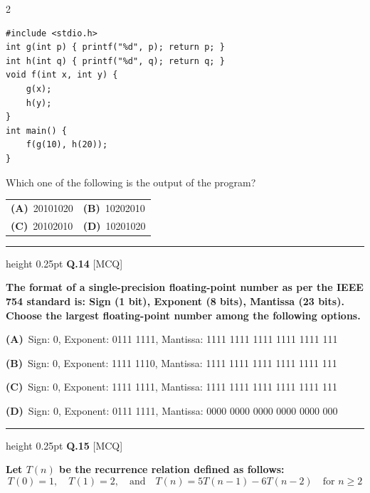 \documentclass[a4paper,10pt,twoside]{article}
\begin{document}
\begin{multicols}{2}
{\begin{verbatim}
#include <stdio.h>
int g(int p) { printf("%d", p); return p; }
int h(int q) { printf("%d", q); return q; }
void f(int x, int y) {
    g(x);
    h(y);
}
int main() {
    f(g(10), h(20));
}
\end{verbatim}
Which one of the following is the output of the program? \par}
\par\vspace{2pt}\noindent
\begin{tabular*}{\columnwidth}{@{\extracolsep{\fill}}p{}p{}@{}}
\textbf{(A)}~20101020 & \textbf{(B)}~10202010 \\
\addlinespace[2pt]
\textbf{(C)}~20102010 & \textbf{(D)}~10201020
\end{tabular*}
\par\vspace{6pt}\hrule height 0.25pt\vspace{6pt}
\noindent\textbf{Q.14} \hfill {\footnotesize\textsf{[MCQ]}}
\par\vspace{2pt}
{\bfseries The format of a single-precision floating-point number as per the IEEE 754 standard is:
Sign (1 bit), Exponent (8 bits), Mantissa (23 bits).
Choose the largest floating-point number among the following options. \par}
\par\vspace{2pt}\noindent
\textbf{(A)}~Sign: 0, Exponent: 0111 1111, Mantissa: 1111 1111 1111 1111 1111 111\par\vspace{2pt}\noindent
\textbf{(B)}~Sign: 0, Exponent: 1111 1110, Mantissa: 1111 1111 1111 1111 1111 111\par\vspace{2pt}\noindent
\textbf{(C)}~Sign: 0, Exponent: 1111 1111, Mantissa: 1111 1111 1111 1111 1111 111\par\vspace{2pt}\noindent
\textbf{(D)}~Sign: 0, Exponent: 0111 1111, Mantissa: 0000 0000 0000 0000 0000 000
\par\vspace{6pt}\hrule height 0.25pt\vspace{6pt}
\noindent\textbf{Q.15} \hfill {\footnotesize\textsf{[MCQ]}}
\par\vspace{2pt}
{\bfseries Let $T(n)$ be the recurrence relation defined as follows:
\[ T(0) = 1, \quad T(1) = 2, \quad \text{and} \quad T(n) = 5T(n-1) - 6T(n-2) \quad \text{for } n \ge 2 \]
}
\end{multicols}
\end{document}
